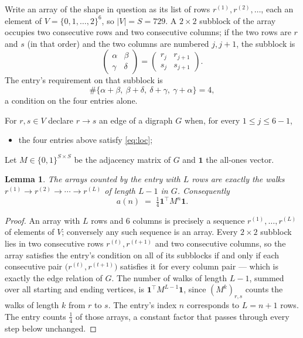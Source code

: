 \documentclass[11pt,a4paper]{article}
\theoremstyle{plain}
\newtheorem{lemma}[theorem]{Lemma}
\theoremstyle{definition}
\begin{document}
Write an array of the shape in question as its list of rows
$r^{(1)},r^{(2)},\dots$, each an element of
$V=\{0,1,\dots,2\}^{6}$, so $|V|=S=729$. A $2\times2$ subblock of the array
occupies two consecutive rows and two consecutive columns; if the two rows are $r$
and $s$ (in that order) and the two columns are numbered $j,j+1$,
the subblock is
\[
\begin{pmatrix}\alpha&\beta\\\gamma&\delta\end{pmatrix}=\begin{pmatrix}r_j&r_{j+1}\\s_j&s_{j+1}\end{pmatrix}.
\]
The entry's requirement on that subblock is
\begin{equation}\label{eq:loc}
\#\{\alpha+\beta,\ \beta+\delta,\ \delta+\gamma,\ \gamma+\alpha\}=4,
\end{equation}
a condition on the four entries alone.

For $r,s\in V$ declare $r\to s$ an edge of a digraph $G$ when, for every
$1\le j\le 6-1$,
\begin{itemize}
\item the four entries above satisfy \eqref{eq:loc};

\end{itemize}
Let $M\in\{0,1\}^{S\times S}$ be the adjacency matrix of $G$ and $\mathbf{1}$ the
all-ones vector.

\begin{lemma}\label{lem:walk}
The arrays counted by the entry with $L$ rows are exactly the walks
$r^{(1)}\to r^{(2)}\to\cdots\to r^{(L)}$ of length $L-1$ in $G$. Consequently
\[
a(n)\;=\;\tfrac1{4}\mathbf{1}^{\!\top}M^{n}\mathbf{1} .
\]
\end{lemma}

\begin{proof}
An array with $L$ rows and $6$ columns is precisely a sequence
$r^{(1)},\dots,r^{(L)}$ of elements of $V$; conversely any such sequence is an array.
Every $2\times2$ subblock lies in two consecutive rows $r^{(t)},r^{(t+1)}$ and two
consecutive columns, so the array satisfies the entry's condition on all of its subblocks
if and only if each consecutive pair $\bigl(r^{(t)},r^{(t+1)}\bigr)$ satisfies it for
every column pair --- which is exactly the edge relation of $G$. The number of walks of
length $L-1$, summed over all starting and ending vertices, is
$\mathbf{1}^{\!\top}M^{L-1}\mathbf{1}$, since $(M^{k})_{r,s}$ counts the walks of
length $k$ from $r$ to $s$. The entry's index $n$ corresponds to $L=n+1$ rows. The entry counts $\tfrac1{4}$ of those arrays, a constant factor that passes through every step below unchanged.
\end{proof}
\end{document}
